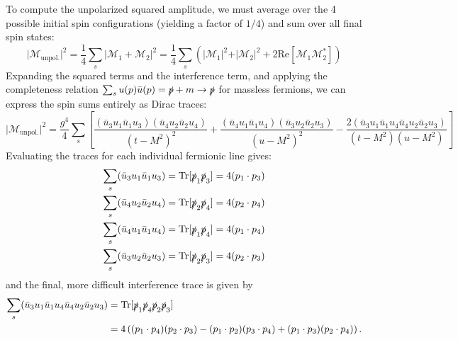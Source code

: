 To compute the unpolarized squared amplitude, we must average over the 4 possible initial spin configurations (yielding a factor of \(1/4\)) and sum over all final spin states:
\[
    \vert \mathcal{M}_{\text{unpol.}} \vert^2 = \frac{1}{4} \sum_{s} \vert \mathcal{M}_1 + \mathcal{M}_2 \vert^2 = \frac{1}{4} \sum_{s} \left( \vert \mathcal{M}_1 \vert^2 + \vert \mathcal{M}_2 \vert^2 + 2\text{Re}[\mathcal{M}_1 \mathcal{M}_2^*] \right)
\]
Expanding the squared terms and the interference term, and applying the completeness relation \(\sum_s u(p)\bar{u}(p) = \slashed{p} + m \to \slashed{p}\) for massless fermions, we can express the spin sums entirely as Dirac traces:
\[
    \vert \mathcal{M}_{\text{unpol.}} \vert^2 = \frac{g^4}{4} \sum_s \left[ \frac{(\bar{u}_3 u_1 \bar{u}_1 u_3)(\bar{u}_4 u_2 \bar{u}_2 u_4)}{(t - M^2)^2} + \frac{(\bar{u}_4 u_1 \bar{u}_1 u_4)(\bar{u}_3 u_2 \bar{u}_2 u_3)}{(u - M^2)^2} - \frac{2 (\bar{u}_3 u_1 \bar{u}_1 u_4 \bar{u}_4 u_2 \bar{u}_2 u_3)}{(t - M^2)(u - M^2)} \right]
\]
Evaluating the traces for each individual fermionic line gives:
\[
    \begin{aligned}
        \sum_{s} (\bar{u}_3 u_1 \bar{u}_1 u_3) & = \text{Tr}[\slashed{p}_1 \slashed{p}_3] = 4(p_1 \cdot p_3) \\
        \sum_{s} (\bar{u}_4 u_2 \bar{u}_2 u_4) & = \text{Tr}[\slashed{p}_2 \slashed{p}_4] = 4(p_2 \cdot p_4) \\
        \sum_{s} (\bar{u}_4 u_1 \bar{u}_1 u_4) & = \text{Tr}[\slashed{p}_1 \slashed{p}_4] = 4(p_1 \cdot p_4) \\
        \sum_{s} (\bar{u}_3 u_2 \bar{u}_2 u_3) & = \text{Tr}[\slashed{p}_2 \slashed{p}_3] = 4(p_2 \cdot p_3)
    \end{aligned}
\]
and the final, more difficult interference trace is given by
\[
    \begin{aligned}
        \sum_{s} (\bar{u}_3 u_1 \bar{u}_1 u_4 \bar{u}_4 u_2 \bar{u}_2 u_3) & = \text{Tr}[\slashed{p}_1 \slashed{p}_4 \slashed{p}_2 \slashed{p}_3]                                                 \\
                                                                           & = 4 \left( (p_1 \cdot p_4)(p_2 \cdot p_3) - (p_1 \cdot p_2)(p_3 \cdot p_4) + (p_1 \cdot p_3)(p_2 \cdot p_4) \right).
    \end{aligned}
\]

